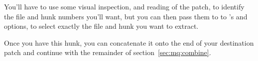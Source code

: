 You'll have to use some visual inspection, and reading of the patch,
to identify the file and hunk numbers you'll want, but you can then
pass them to to 's 
and  options, to select exactly the file
and hunk you want to extract.

Once you have this hunk, you can concatenate it onto the end of your
destination patch and continue with the remainder of
section~\ref{sec:mq:combine}.


